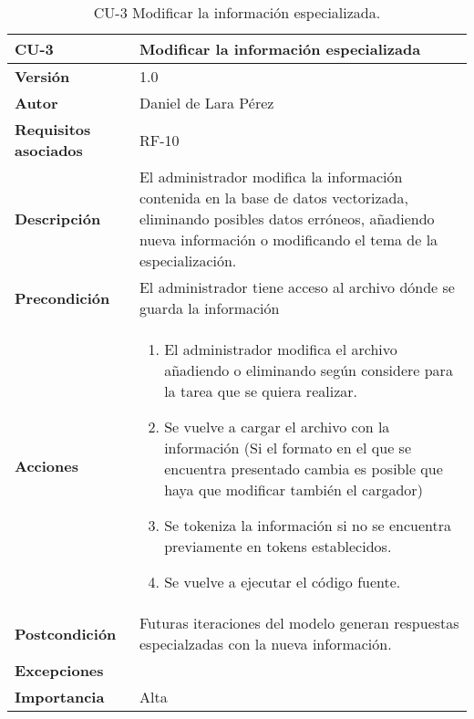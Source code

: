 \begin{table}[p]
	\centering
	\begin{tabularx}{\linewidth}{ p{} p{} }
		\toprule
		\textbf{CU-3}    & \textbf{Modificar la información especializada}\\
		\toprule
		\textbf{Versión}              & 1.0    \\
		\textbf{Autor}                & Daniel de Lara Pérez \\
		\textbf{Requisitos asociados} & RF-10 \\
		\textbf{Descripción}          & El administrador modifica la información contenida en la base de datos vectorizada, eliminando posibles datos erróneos, añadiendo nueva información o modificando el tema de la especialización. \\
		\textbf{Precondición}         & El administrador tiene acceso al archivo dónde se guarda la información \\
		\textbf{Acciones}             &
		\begin{enumerate}
			\def\labelenumi{\arabic{enumi}.}
			\tightlist
			\item El administrador modifica el archivo añadiendo o eliminando según considere para la tarea que se quiera realizar.
            \item Se vuelve a cargar el archivo con la información (Si el formato en el que se encuentra presentado cambia es posible que haya que modificar también el cargador)
            \item Se tokeniza la información si no se encuentra previamente en tokens establecidos.
            \item Se vuelve a ejecutar el código fuente.
         
		\end{enumerate}\\
		\textbf{Postcondición}        & Futuras iteraciones del modelo generan respuestas especialzadas con la nueva información. \\
		\textbf{Excepciones}          &  \\
		\textbf{Importancia}          & Alta\\
		\bottomrule
	\end{tabularx}
	\caption{CU-3 Modificar la información especializada.}
\end{table}

